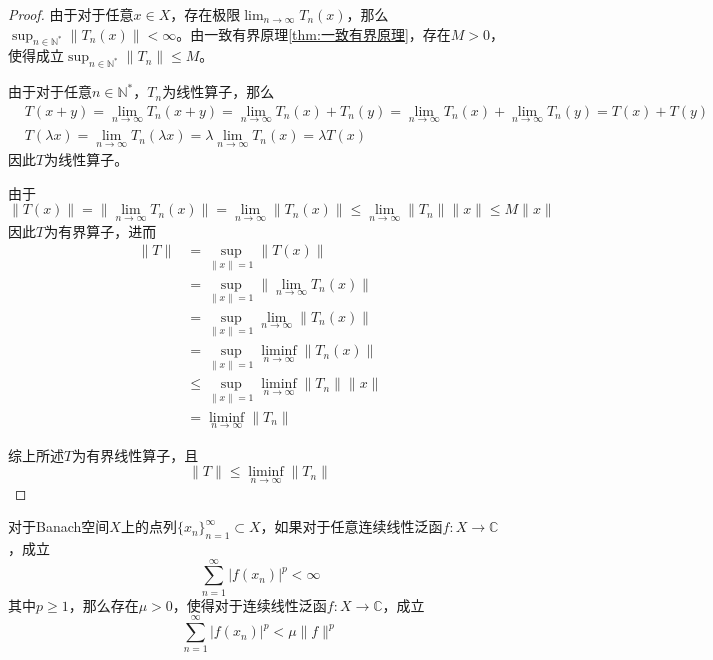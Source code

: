\documentclass[lang = cn, scheme = chinese, thmcnt = section]{elegantbook}
\newcommand{\N}{\mathbb{N}}            %
\newcommand{\C}{\mathbb{C}}  		   %
\newcommand{\sub}{\subset}             %
\begin{document}
\begin{proof}
	由于对于任意$x\in X$，存在极限$\displaystyle\lim_{n\to\infty}T_n(x)$，那么$\displaystyle\sup_{n\in\N^*}\|T_n(x)\|<\infty$。由一致有界原理\ref{thm:一致有界原理}，存在$M>0$，使得成立$\displaystyle\sup_{n\in\N^*}\|T_n\|\le M$。
	
	由于对于任意$n\in\N^*$，$T_n$为线性算子，那么
	\begin{align*}
		&T(x+y)
		=\lim_{n\to\infty}T_n(x+y)
		=\lim_{n\to\infty}T_n(x)+T_n(y)
		=\lim_{n\to\infty}T_n(x)+\lim_{n\to\infty}T_n(y)
		=T(x)+T(y)\\
		&T(\lambda x)
		=\lim_{n\to\infty}T_n(\lambda x)
		=\lambda\lim_{n\to\infty}T_n(x)
		=\lambda T(x)
	\end{align*}
	因此$T$为线性算子。
	
	由于
	$$
	\|T(x)\|
	=\|\lim_{n\to\infty}T_n(x)\|
	=\lim_{n\to\infty}\|T_n(x)\|
	\le \lim_{n\to\infty}\|T_n\|\|x\|
	\le M\|x\|
	$$
	因此$T$为有界算子，进而
	\begin{align*}
		\|T\|
		& = \sup_{\|x\|=1}\|T(x)\|\\
		& = \sup_{\|x\|=1}\|\lim_{n\to\infty}T_n(x)\|\\
		& = \sup_{\|x\|=1}\lim_{n\to\infty}\|T_n(x)\|\\
		& = \sup_{\|x\|=1}\liminf_{n\to\infty}\|T_n(x)\|\\
		& \le \sup_{\|x\|=1}\liminf_{n\to\infty}\|T_n\|\|x\|\\
		& = \liminf_{n\to\infty}\|T_n\|
	\end{align*}
	
	综上所述$T$为有界线性算子，且
	$$
	\|T\|\le \liminf_{n\to\infty}\|T_n\|
	$$
\end{proof}

\begin{proposition}
	对于Banach空间$X$上的点列$\{x_n\}_{n=1}^{\infty}\sub X$，如果对于任意连续线性泛函$f:X\to\C$，成立
	$$
	\sum_{n=1}^{\infty}|f(x_n)|^p<\infty
	$$
	其中$p\ge 1$，那么存在$\mu>0$，使得对于连续线性泛函$f:X\to\C$，成立
	$$
	\sum_{n=1}^{\infty}|f(x_n)|^p<\mu\|f\|^p
	$$
\end{proposition}
\end{document}
